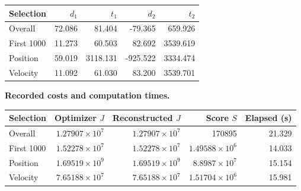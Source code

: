 \begin{center}
\begin{tabular}{lrrrr}
\toprule
Selection & $d_1$ & $t_1$ & $d_2$ & $t_2$\\
\midrule
Overall & 72.086 & 81.404 & -79.365 & 659.926\\
First 1000 & 11.273 & 60.503 & 82.692 & 3539.619\\
Position & 59.019 & 3118.131 & -925.522 & 3334.474\\
Velocity & 11.092 & 61.030 & 83.200 & 3539.701\\
\bottomrule
\end{tabular}
\end{center}
\par\noindent\textbf{Recorded costs and computation times.}
\begin{center}
\begin{tabular}{lrrrr}
\toprule
Selection & Optimizer $J$ & Reconstructed $J$ & Score $S$ & Elapsed (s)\\
\midrule
Overall & $1.27907\times10^{7}$ & $1.27907\times10^{7}$ & 170895 & 21.329\\
First 1000 & $1.52278\times10^{7}$ & $1.52278\times10^{7}$ & $1.49588\times10^{6}$ & 14.033\\
Position & $1.69519\times10^{9}$ & $1.69519\times10^{9}$ & $8.8987\times10^{7}$ & 15.154\\
Velocity & $7.65188\times10^{7}$ & $7.65188\times10^{7}$ & $1.51704\times10^{6}$ & 15.981\\
\bottomrule
\end{tabular}
\end{center}
\clearpage

